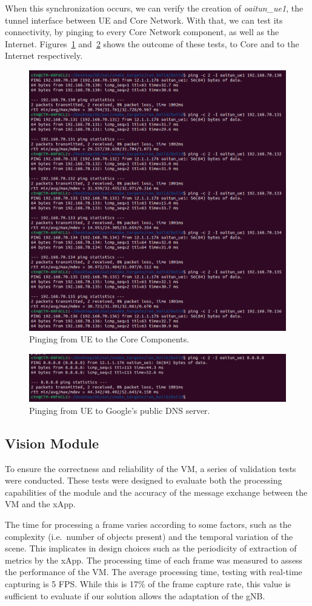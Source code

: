 When this synchronization occurs, we can verify the creation of \textit{oaitun\_ue1}, the tunnel interface between UE and Core Network.
With that, we can test its connectivity, by pinging to every Core Network component, as well as the Internet.
Figures~\ref{fig:ping_ue_core} and~\ref{fig:ping_ue_internet} shows the outcome of these tests, to Core and to the Internet respectively.

\begin{figure}[H]
    \centering
    \includegraphics[width=0.5\linewidth]{figures/ue_core_ping}
    \caption{Pinging from UE to the Core Components.}
    \label{fig:ping_ue_core}
\end{figure}

\begin{figure}[H]
    \centering
    \includegraphics[width=0.5\linewidth]{figures/ue_to_ext}
    \caption{Pinging from UE to Google's public DNS server.}
    \label{fig:ping_ue_internet}
\end{figure}


\subsection{Vision Module}\label{subsec:cv_module}
To ensure the correctness and reliability of the VM, a series of validation tests were conducted.
These tests were designed to evaluate both the processing capabilities of the module and the accuracy of the message exchange between the VM and the xApp.

The time for processing a frame varies according to some factors, such as the complexity (i.e.\ number of objects present) and the temporal variation of the scene.
This implicates in design choices such as the periodicity of extraction of metrics by the xApp.
The processing time of each frame was measured to assess the performance of the VM\@.
The average processing time, testing with real-time capturing is 5 FPS\@.
While this is 17\% of the frame capture rate, this value is sufficient to evaluate if our solution allows the adaptation of the gNB\@.


